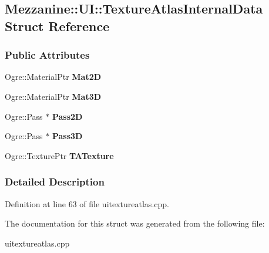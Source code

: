 \hypertarget{structMezzanine_1_1UI_1_1TextureAtlasInternalData}{
\subsection{Mezzanine::UI::TextureAtlasInternalData Struct Reference}
\label{structMezzanine_1_1UI_1_1TextureAtlasInternalData}
}
\subsubsection*{Public Attributes}
\begin{DoxyCompactItemize}
\item 
\hypertarget{structMezzanine_1_1UI_1_1TextureAtlasInternalData_a2cb15005a44002c0de3aa928ceb5a078}{
Ogre::MaterialPtr {\bfseries Mat2D}}
\label{structMezzanine_1_1UI_1_1TextureAtlasInternalData_a2cb15005a44002c0de3aa928ceb5a078}

\item 
\hypertarget{structMezzanine_1_1UI_1_1TextureAtlasInternalData_a1709f35e651a8b1648d09840f9cc1cb2}{
Ogre::MaterialPtr {\bfseries Mat3D}}
\label{structMezzanine_1_1UI_1_1TextureAtlasInternalData_a1709f35e651a8b1648d09840f9cc1cb2}

\item 
\hypertarget{structMezzanine_1_1UI_1_1TextureAtlasInternalData_a62f9ce0958e615ddf470987677672ba2}{
Ogre::Pass $\ast$ {\bfseries Pass2D}}
\label{structMezzanine_1_1UI_1_1TextureAtlasInternalData_a62f9ce0958e615ddf470987677672ba2}

\item 
\hypertarget{structMezzanine_1_1UI_1_1TextureAtlasInternalData_a11ff59d9a637080639855ae9a2bf0be8}{
Ogre::Pass $\ast$ {\bfseries Pass3D}}
\label{structMezzanine_1_1UI_1_1TextureAtlasInternalData_a11ff59d9a637080639855ae9a2bf0be8}

\item 
\hypertarget{structMezzanine_1_1UI_1_1TextureAtlasInternalData_adeba984d359ee7bf0263c7139827e443}{
Ogre::TexturePtr {\bfseries TATexture}}
\label{structMezzanine_1_1UI_1_1TextureAtlasInternalData_adeba984d359ee7bf0263c7139827e443}

\end{DoxyCompactItemize}


\subsubsection{Detailed Description}


Definition at line 63 of file uitextureatlas.cpp.



The documentation for this struct was generated from the following file:\begin{DoxyCompactItemize}
\item 
uitextureatlas.cpp\end{DoxyCompactItemize}
